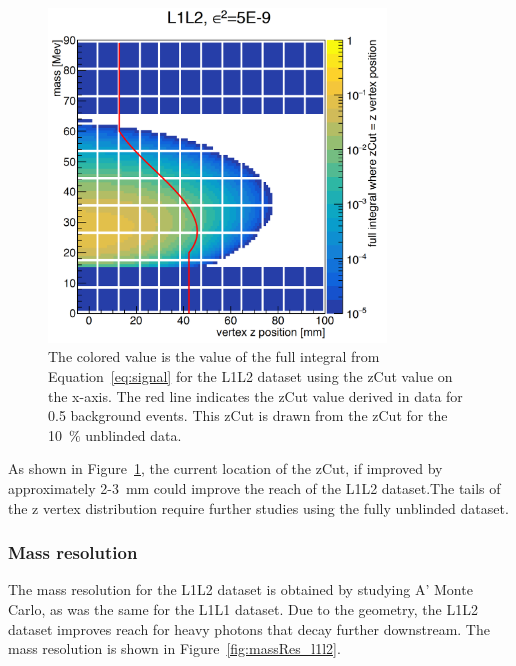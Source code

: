 \begin{figure}[H]
  \centering
      \includegraphics[width=0.8\textwidth]{plots/L1L2_effmz.png}
  \caption{The colored value is the value of the full integral from Equation~\eqref{eq:signal} for the L1L2 dataset using the zCut value on the x-axis. The red line indicates the zCut value derived in data for 0.5 background events. This zCut is drawn from the zCut for the 10~$\%$ unblinded data.}
  \label{fig:integratedVal2D_l1l2}
\end{figure} 

As shown in Figure~\ref{fig:integratedVal2D_l1l2}, the current location of the zCut, if improved by approximately 2-3~mm could improve the reach of the L1L2 dataset.The tails of the z vertex distribution require further studies using the fully unblinded dataset. 


\subsubsection{Mass resolution}

The mass resolution for the L1L2 dataset is obtained by studying A' Monte Carlo, as was the same for the L1L1 dataset. Due to the geometry, the L1L2 dataset improves reach for heavy photons that decay further downstream. The mass resolution is shown in Figure~\ref{fig:massRes_l1l2}.

